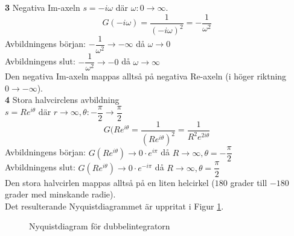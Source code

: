 \documentclass[12pt]{article}
\begin{document}
\textbf{3} Negativa Im-axeln
$s = -i\omega$ där $\omega: 0 \to \infty$.
\[G(-i\omega) = \frac{1}{(-i\omega)^2} = -\frac{1}{\omega^2}\]
Avbildningens början: $-\dfrac{1}{\omega^2} \to -\infty$ då $\omega \to 0$ \\
Avbildningens slut: $-\dfrac{1}{\omega^2} \to -0$ då $\omega \to \infty$ \\
Den negativa Im-axeln mappas alltså på negativa Re-axeln (i höger riktning $0 \to -\infty$). \\

\textbf{4} Stora halvcirclens avbildning \\
$s = Re^{i\theta}$ där $r \to \infty, \theta: -\dfrac{\pi}{2} \to \dfrac{\pi}{2}$
\[G(Re^{i\theta} = \frac{1}{(Re^{i\theta})^2} = \frac{1}{R^2e^{2i\theta}}\]
Avbildningens början: $G(Re^{i\theta}) \to 0 \cdot e^{i\pi}$ då $R \to \infty, \theta = -\dfrac{\pi}{2}$ \\
Avbildningens slut: $G(Re^{i\theta}) \to 0 \cdot e^{-i\pi}$ då $R \to \infty, \theta = \dfrac{\pi}{2}$ \\
Den stora halvcirlen mappas alltså på en liten helcirkel ($180$ grader till $-180$ grader med minskande radie). \\

Det resulterande Nyquistdiagrammet är uppritat i Figur \ref{fig:315nyquist}.
\begin{figure}[h!]
\centering
{}
\caption{Nyquistdiagram för dubbelintegratorn}
\label{fig:315nyquist}
\end{figure}
\FloatBarrier
\end{document}
